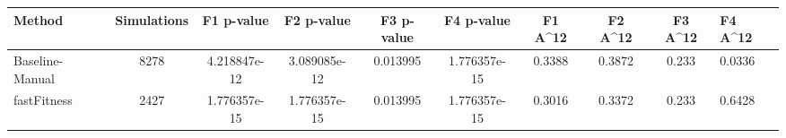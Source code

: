 \begin{tabular}{lcccccccc}
\toprule
         Method &  Simulations &   F1 p-value &   F2 p-value &  F3 p-value &   F4 p-value &  F1 A^12 &  F2 A^12 &  F3 A^12 &  F4 A^12 \\
\midrule
Baseline-Manual &         8278 & 4.218847e-12 & 3.089085e-12 &    0.013995 & 1.776357e-15 &   0.3388 &   0.3872 &    0.233 &   0.0336 \\
    fastFitness &         2427 & 1.776357e-15 & 1.776357e-15 &    0.013995 & 1.776357e-15 &   0.3016 &   0.3372 &    0.233 &   0.6428 \\
\bottomrule
\end{tabular}
